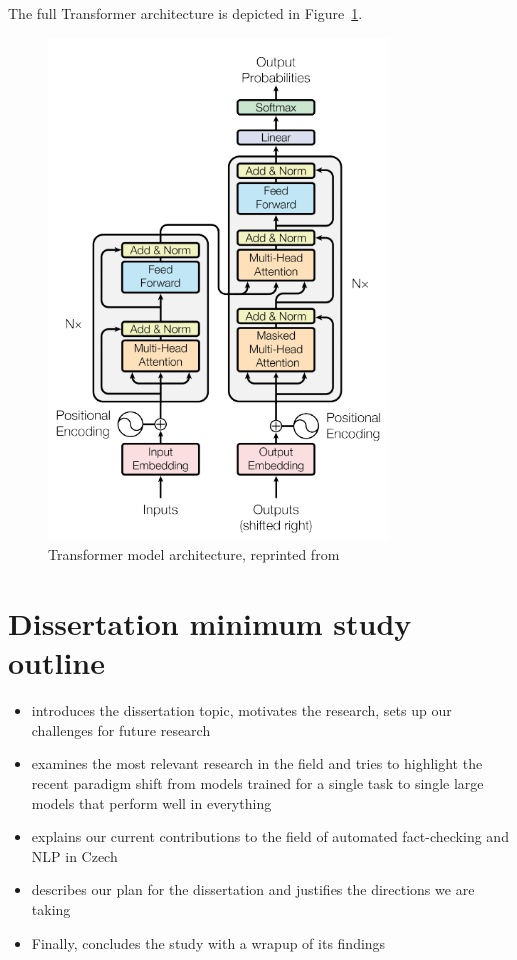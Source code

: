 The full Transformer architecture is depicted in Figure~\ref{fig:transformer}.

\begin{figure}
    \includegraphics[width=9cm]{fig/transformer.pdf}
    \caption{Transformer model architecture, reprinted from~\cite{vaswani}}
    \label{fig:transformer}
    \end{figure}

\section{Dissertation minimum study outline}
 
\begin{itemize}
\item {} introduces the dissertation topic, motivates the research, sets up our challenges for future research 

\item {} examines the most relevant research in the field and tries to highlight the recent paradigm shift from models trained for a single task to single large models that perform well in everything

\item {} explains our current contributions to the field of automated fact-checking and NLP in Czech

\item {} describes our plan for the dissertation and justifies the directions we are taking

\item Finally, {} concludes the study with a wrapup of its findings

\end{itemize}

